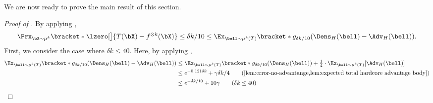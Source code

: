 We are now ready to prove the main result of this section.
\begin{proof}[Proof of ]
    By applying ,
    \begin{equation*}
        \Prx_{\bX \sim \mu^k}\bracket*{\lzero[\big]{T(\bX)-f^{\otimes k}(\bX)} \leq \delta k/10} \leq \Ex_{\bell \sim \mu^k(T)}\bracket*{g_{\delta k/10}(\Dens_H(\bell) - \Adv_H(\bell))}.
    \end{equation*}
    First, we consider the case where $\delta k \leq 40$. Here, by applying ,
    \begin{align*}
        \Ex_{\bell \sim \mu^k(T)}\bracket*{g_{\delta k/10}(\Dens_H(\bell) - \Adv_H(\bell))} &\leq \Ex_{\bell \sim \mu^k(T)}\bracket*{g_{\delta k/10}(\Dens_H(\bell))} + \tfrac{1}{4}\cdot \Ex_{\bell \sim \mu^k(T)}[\Adv_H(\bell)]\\
        &\leq e^{-0.121 \delta k} + \gamma \delta k/4 \tag{\Cref{lem:error-no-advantange,lem:expected total hardcore advantage body}}\\
        &\leq e^{-\delta k/10} + 10\gamma\tag{$\delta k \leq 40$}
    \end{align*}


\end{proof}

